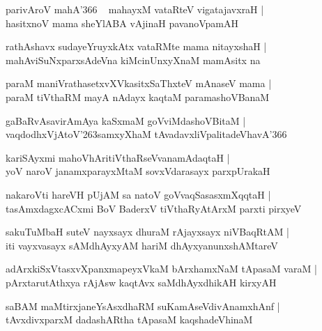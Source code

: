 \documentclass[twoside,12pt,openright]{book}
\def\S{\char'263}
\newcounter{shloka}[chapter]
\begin{document}
\begin{shloka}%
parivAroV mahA\char'366 ~ mahayxM vataRteV vigatajavxraH |\\
hasitxnoV mama sheYlABA vAjinaH pavanoVpamAH 
\end{shloka}

\begin{shloka}%
rathAshavx sudayeYruyxkAtx vataRMte mama nitayxshaH |\\
mahAviSuNxparxsAdeVna kiMcinUnxyXnaM mamAsitx na 
\end{shloka}

\begin{shloka}%
paraM maniVrathasetxvXVkasitxSaThxteV mAnaseV mama |\\
paraM tiVthaRM mayA nAdayx kaqtaM paramashoVBanaM
\end{shloka}

\begin{shloka}%
gaBaRvAsavirAmAya kaSxmaM goVviMdashoVBitaM |\\
vaqdodhxVjAtoV\S samxyXhaM tAvadavxliVpalitadeVhavA\char'366 
\end{shloka}

\begin{shloka}%
kariSAyxmi mahoVhAritiVthaRseVvanamAdaqtaH |\\
yoV naroV janamxparayxMtaM sovxVdarasayx parxpUrakaH 
\end{shloka}

\begin{shloka}%
nakaroVti hareVH pUjAM sa natoV goVvaqSasasxmXqqtaH |\\
tasAmxdagxcACxmi BoV BaderxV tiVthaRyAtArxM parxti pirxyeV 
\end{shloka}

\begin{shloka}%
sakuTuMbaH suteV nayxsayx dhuraM rAjayxsayx niVBaqRtAM |\\
iti vayxvasayx sAMdhAyxyAM hariM dhAyxyanunxshAMtareV
\end{shloka}

\begin{shloka}%
adArxkiSxVtasxvXpanxmapeyxVkaM bArxhamxNaM tApasaM varaM |\\
pArxtarutAthxya rAjAsw kaqtAvx saMdhAyxdhikAH kirxyAH 
\end{shloka}

\begin{shloka}%
saBAM maMtirxjaneYsAsxdhaRM suKamAseVdivAnamxhAnf |\\
tAvxdivxparxM dadashARtha tApasaM kaqshadeVhinaM 
\end{shloka}
\end{document}
